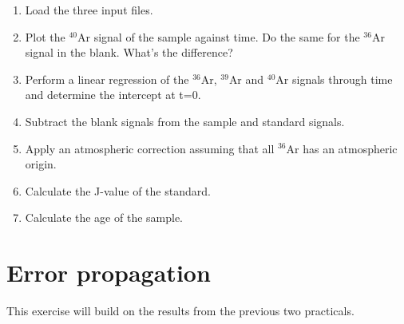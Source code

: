\documentclass{book}
\begin{document}
\begin{enumerate}
\item Load the three input files.
\item Plot the $^{40}$Ar signal of the sample against time. Do the
  same for the $^{36}$Ar signal in the blank. What's the difference?
\item Perform a linear regression of the $^{36}$Ar, $^{39}$Ar and
  $^{40}$Ar signals through time and determine the intercept at t=0.
\item Subtract the blank signals from the sample and standard signals.
\item Apply an atmospheric correction assuming that all $^{36}$Ar has
  an atmospheric origin.
\item Calculate the J-value of the standard.
\item Calculate the age of the sample.
\end{enumerate}

\section{Error propagation}

This exercise will build on the results from the previous two
practicals.
\end{document}
